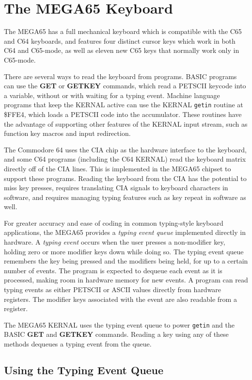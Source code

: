 
\chapter{The MEGA65 Keyboard}

The MEGA65 has a full mechanical keyboard which is compatible with the C65 and
C64 keyboards, and features four distinct cursor keys which work in both C64
and C65-mode, as well as eleven new C65 keys that normally work only in
C65-mode.

There are several ways to read the keyboard from programs. BASIC programs can
use the {\bf GET} or {\bf GETKEY} commands, which read a PETSCII keycode into
a variable, without or with waiting for a typing event. Machine language
programs that keep the KERNAL active can use the KERNAL {\tt getin} routine at
\$FFE4, which loads a PETSCII code into the accumulator. These routines have
the advantage of supporting other features of the KERNAL input stream, such as
function key macros and input redirection.

The Commodore 64 uses the CIA chip as the hardware interface to the keyboard,
and some C64 programs (including the C64 KERNAL) read the keyboard matrix
directly off of the CIA lines. This is implemented in the MEGA65 chipset to
support these programs. Reading the keyboard from the CIA has the potential to
miss key presses, requires translating CIA signals to keyboard characters in
software, and requires managing typing features such as key repeat in software
as well.

For greater accuracy and ease of coding in common typing-style keyboard
applications, the MEGA65 provides a {\em typing event queue} implemented
directly in hardware. A {\em typing event} occurs when the user presses a
non-modifier key, holding zero or more modifier keys down while doing so. The
typing event queue remembers the key being pressed and the modifiers being
held, for up to a certain number of events. The program is expected to dequeue
each event as it is processed, making room in hardware memory for new events.
A program can read typing events as either PETSCII or ASCII values directly
from hardware registers. The modifier keys associated with the event are also
readable from a register.

The MEGA65 KERNAL uses the typing event queue to power {\tt getin} and the
BASIC {\bf GET} and {\bf GETKEY} commands. Reading a key using any of these
methods dequeues a typing event from the queue.

\section{Using the Typing Event Queue}

